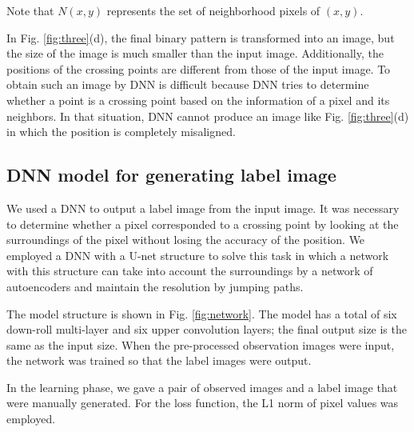 \noindent Note that $N(x,y)$ represents the set of neighborhood pixels of $(x,y)$.  

In Fig. \ref{fig:three}(d), the final binary pattern is transformed into an image, but the size of the image is much smaller than the input image. Additionally, the positions of the crossing points are different from those of the input image. To obtain such an image by DNN is difficult because DNN tries to determine whether a point is a crossing point based on the information of a pixel and its neighbors. In that situation, DNN cannot produce an image like Fig. \ref{fig:three}(d) in which the position is completely misaligned. 

\subsection{DNN model for generating label image}
We used a DNN to output a label image from the input image. It was necessary to determine whether a pixel corresponded to a crossing point by looking at the surroundings of the pixel without losing the accuracy of the position. We employed a DNN with a U-net structure \cite{Ronneberger15} to solve this task in which a network with this structure can take into account the surroundings by a network of autoencoders and maintain the resolution by jumping paths. 

The model structure is shown in Fig. \ref{fig:network}.  The model has a total of six down-roll multi-layer and six upper convolution layers; the final output size is the same as the input size. When the pre-processed observation images were input, the network was trained so that the label images were output. 

In the learning phase, we gave a pair of observed images and a label image that were manually generated. For the loss function, the L1 norm of pixel values was employed.

